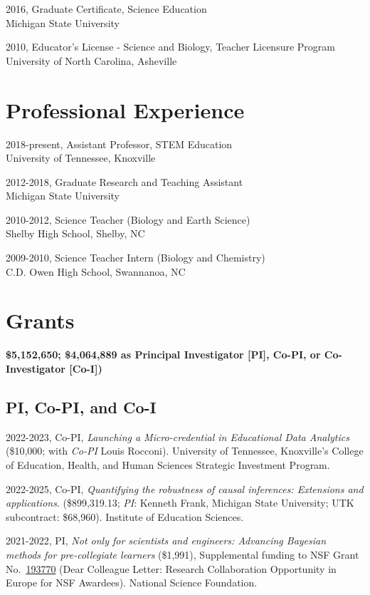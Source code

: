 \documentclass[
  14,
]{article}
\begin{document}
2016, Graduate Certificate, Science Education\\
Michigan State University

2010, Educator's License - Science and Biology, Teacher Licensure
Program\\
University of North Carolina, Asheville

\hypertarget{professional-experience}{%
\section{Professional Experience}\label{professional-experience}}

2018-present, Assistant Professor, STEM Education\\
University of Tennessee, Knoxville

2012-2018, Graduate Research and Teaching Assistant\\
Michigan State University

2010-2012, Science Teacher (Biology and Earth Science)\\
Shelby High School, Shelby, NC

2009-2010, Science Teacher Intern (Biology and Chemistry)\\
C.D. Owen High School, Swannanoa, NC

\hypertarget{grants}{%
\section{Grants}\label{grants}}

\textbf{\$5,152,650; \$4,064,889 as Principal Investigator {[}PI{]},
Co-PI, or Co-Investigator {[}Co-I{]})}

\hypertarget{pi-co-pi-and-co-i}{%
\subsection{PI, Co-PI, and Co-I}\label{pi-co-pi-and-co-i}}

2022-2023, Co-PI, \emph{Launching a Micro-credential in Educational Data
Analytics} (\$10,000; with \emph{Co-PI} Louis Rocconi). University of
Tennessee, Knoxville's College of Education, Health, and Human Sciences
Strategic Investment Program.

2022-2025, Co-PI, \emph{Quantifying the robustness of causal inferences:
Extensions and applications}. (\$899,319.13; \emph{PI}: Kenneth Frank,
Michigan State University; UTK subcontract: \$68,960). Institute of
Education Sciences.

2021-2022, PI, \emph{Not only for scientists and engineers: Advancing
Bayesian methods for pre-collegiate learners} (\$1,991), Supplemental
funding to NSF Grant
No.~\href{https://www.nsf.gov/awardsearch/showAward?AWD_ID=1937700\&HistoricalAwards=false}{193770}
(Dear Colleague Letter: Research Collaboration Opportunity in Europe for
NSF Awardees). National Science Foundation.
\end{document}
